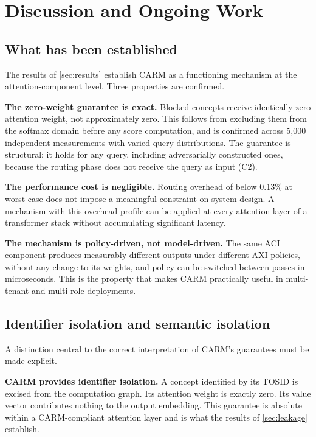 \documentclass[11pt,a4paper]{article}
\theoremstyle{definition}
\begin{document}
\section{Discussion and Ongoing Work}
\label{sec:discussion}

\subsection{What has been established}

The results of \cref{sec:results} establish CARM as a functioning mechanism
at the attention-component level. Three properties are confirmed.

\textbf{The zero-weight guarantee is exact.} Blocked concepts receive
identically zero attention weight, not approximately zero. This follows from
excluding them from the softmax domain before any score computation, and is
confirmed across 5,000 independent measurements with varied query
distributions. The guarantee is structural: it holds for any query, including
adversarially constructed ones, because the routing phase does not receive the
query as input (C2).

\textbf{The performance cost is negligible.} Routing overhead of below 0.13\%
at worst case does not impose a meaningful constraint on system design. A
mechanism with this overhead profile can be applied at every attention layer
of a transformer stack without accumulating significant latency.

\textbf{The mechanism is policy-driven, not model-driven.} The same ACI
component produces measurably different outputs under different AXI policies,
without any change to its weights, and policy can be switched between passes
in microseconds. This is the property that makes CARM practically useful in
multi-tenant and multi-role deployments.

\subsection{Identifier isolation and semantic isolation}
\label{sec:isolation}

A distinction central to the correct interpretation of CARM's guarantees must
be made explicit.

\textbf{CARM provides identifier isolation.} A concept identified by its
TOSID is excised from the computation graph. Its attention weight is exactly
zero. Its value vector contributes nothing to the output embedding. This
guarantee is absolute within a CARM-compliant attention layer and is what
the results of \cref{sec:leakage} establish.
\end{document}
